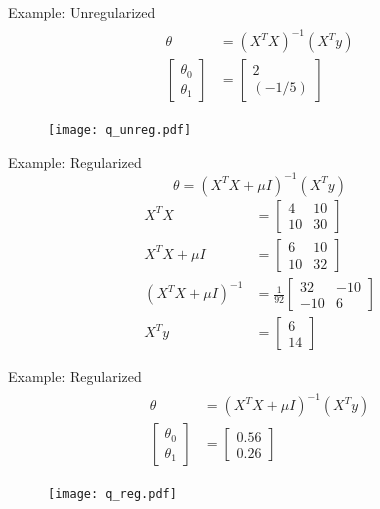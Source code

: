 \documentclass{beamer}
\begin{document}
\begin{frame}{Example: Unregularized}
\vspace{0.4cm}
\begin{align*}
\begin{split}
\theta &= (X^{T}X)^{-1}(X^{T}y)\\
\begin{bmatrix}
\theta_{0}\\
\theta_{1}
\end{bmatrix} &= 
\begin{bmatrix}
2\\
(-1/5)
\end{bmatrix} 
\end{split}
\end{align*}
\vspace{-0.8cm}
\begin{figure}
\texttt{[image: q\_unreg.pdf]}
\end{figure}
\end{frame}

\begin{frame}{Example: Regularized}
\[
\theta = (X^{T}X+\mu I)^{-1}(X^{T}y)
\]
\pause
\begin{align*}
X^{T}X &= \begin{bmatrix}
4 &10\\10&30
\end{bmatrix} \\
X^{T}X+\mu I &= \begin{bmatrix}
6 &10\\10&32
\end{bmatrix} \\
(X^{T}X+\mu I)^{-1} &= \frac{1}{92} \begin{bmatrix}
32 & -10\\
-10& 6
\end{bmatrix}\\
X^{T}y &= \begin{bmatrix}
6\\
14
\end{bmatrix}
\end{align*}
\end{frame}

\begin{frame}{Example: Regularized}
\vspace{0.4cm}
\begin{align*}
\begin{split}
\theta &= (X^{T}X+\mu I)^{-1}(X^{T}y) \\
\begin{bmatrix}
\theta_{0}\\
\theta_{1}
\end{bmatrix} &= 
\begin{bmatrix}
0.56\\
0.26
\end{bmatrix} 
\end{split}
\end{align*}
\vspace{-0.8cm}
\begin{figure}
\texttt{[image: q\_reg.pdf]}
\end{figure}
\end{frame}
\end{document}

